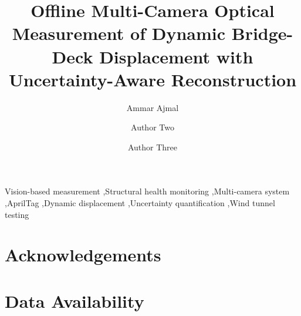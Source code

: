 \documentclass[preprint,12pt]{elsarticle}
\begin{document}
\begin{frontmatter}

\title{Offline Multi-Camera Optical Measurement of Dynamic Bridge-Deck Displacement with Uncertainty-Aware Reconstruction}

\author[inst1]{Ammar Ajmal}
\author[inst1]{Author Two}
\author[inst1]{Author Three}


\begin{abstract}

\end{abstract}

\begin{keyword}
Vision-based measurement \sep Structural health monitoring \sep Multi-camera system \sep AprilTag \sep Dynamic displacement \sep Uncertainty quantification \sep Wind tunnel testing
\end{keyword}

\end{frontmatter}

\linenumbers









\section*{Acknowledgements}

\section*{Data Availability}



\end{document}
